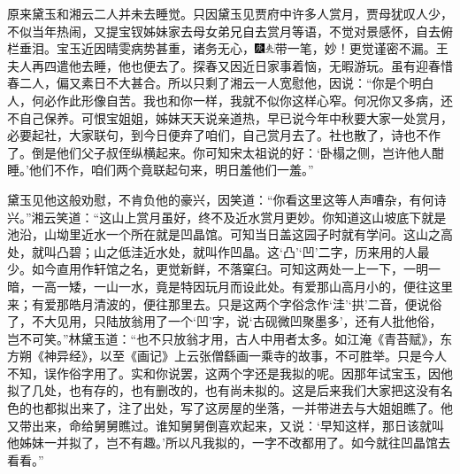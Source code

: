 原来黛玉和湘云二人并未去睡觉。只因黛玉见贾府中许多人赏月，贾母犹叹人少，不似当年热闹，又提宝钗姊妹家去母女弟兄自去赏月等语，不觉对景感怀，自去俯栏垂泪。宝玉近因晴雯病势甚重，诸务无心，{\includegraphics[width=3mm]{../Images/00004}\includegraphics[width=3mm]{../Images/00012}\footnotesize \kaishu 带一笔，妙！更觉谨密不漏。}王夫人再四遣他去睡，他也便去了。探春又因近日家事着恼，无暇游玩。虽有迎春惜春二人，偏又素日不大甚合。所以只剩了湘云一人宽慰他，因说：“你是个明白人，何必作此形像自苦。我也和你一样，我就不似你这样心窄。何况你又多病，还不自己保养。可恨宝姐姐，姊妹天天说亲道热，早已说今年中秋要大家一处赏月，必要起社，大家联句，到今日便弃了咱们，自己赏月去了。社也散了，诗也不作了。倒是他们父子叔侄纵横起来。你可知宋太祖说的好：‘卧榻之侧，岂许他人酣睡。’他们不作，咱们两个竟联起句来，明日羞他们一羞。”

黛玉见他这般劝慰，不肯负他的豪兴，因笑道：“你看这里这等人声嘈杂，有何诗兴。”湘云笑道：“这山上赏月虽好，终不及近水赏月更妙。你知道这山坡底下就是池沿，山坳里近水一个所在就是凹晶馆。可知当日盖这园子时就有学问。这山之高处，就叫凸碧；山之低洼近水处，就叫作凹晶。这‘凸’‘凹’二字，历来用的人最少。如今直用作轩馆之名，更觉新鲜，不落窠臼。可知这两处一上一下，一明一暗，一高一矮，一山一水，竟是特因玩月而设此处。有爱那山高月小的，便往这里来；有爱那皓月清波的，便往那里去。只是这两个字俗念作‘洼’‘拱’二音，便说俗了，不大见用，只陆放翁用了一个‘凹’字，说‘古砚微凹聚墨多’，还有人批他俗，岂不可笑。”林黛玉道：“也不只放翁才用，古人中用者太多。如江淹《青苔赋》，东方朔《神异经》，以至《画记》上云张僧繇画一乘寺的故事，不可胜举。只是今人不知，误作俗字用了。实和你说罢，这两个字还是我拟的呢。因那年试宝玉，因他拟了几处，也有存的，也有删改的，也有尚未拟的。这是后来我们大家把这没有名色的也都拟出来了，注了出处，写了这房屋的坐落，一并带进去与大姐姐瞧了。他又带出来，命给舅舅瞧过。谁知舅舅倒喜欢起来，又说：‘早知这样，那日该就叫他姊妹一并拟了，岂不有趣。’所以凡我拟的，一字不改都用了。如今就往凹晶馆去看看。”

